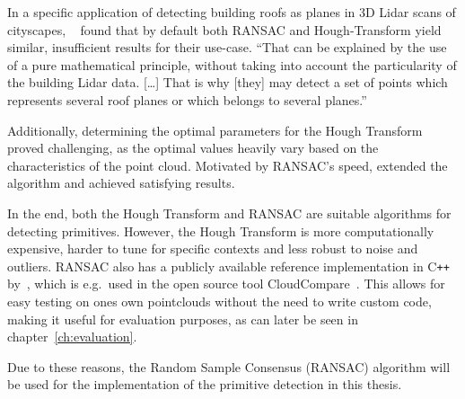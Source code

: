 In a specific application of detecting building roofs as planes in 3D Lidar scans of cityscapes,
~\cite{tarsha-kurdi_hough-transform_2007} found that by default both RANSAC and Hough-Transform yield similar,
insufficient results for their use-case.
“That can be explained by the use of a pure mathematical principle,
without taking into account the particularity of the building Lidar data. […] That is why
[they] may detect a set of points which represents several roof planes or which belongs to several planes.”

Additionally, determining the optimal parameters for the Hough Transform proved challenging,
as the optimal values heavily vary based on the characteristics of the point cloud.
Motivated by RANSAC's speed, \citeauthor{tarsha-kurdi_hough-transform_2007} extended the algorithm and achieved satisfying results.

In the end, both the Hough Transform and RANSAC are suitable algorithms for detecting primitives.
However, the Hough Transform is more computationally expensive, harder to tune for specific contexts and less robust to noise and outliers.
RANSAC also has a publicly available reference implementation in C\texttt{++} by~\parencite{schnabel_efficient_2007},
which is e.g.\ used in the open source tool CloudCompare~\parencite{daniel_girardeau-montaut_cloudcompare_nodate}.
This allows for easy testing on ones own pointclouds without the need to write custom code,
making it useful for evaluation purposes, as can later be seen in chapter~\ref{ch:evaluation}.

Due to these reasons, the Random Sample Consensus (RANSAC) algorithm will be used for the implementation of the primitive detection in this thesis.
